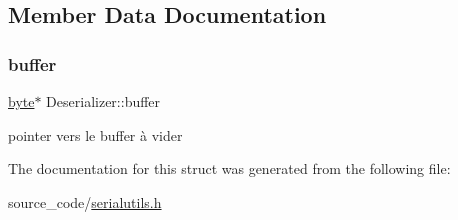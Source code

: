 \subsection{Member Data Documentation}
\mbox{\label{struct_deserializer_a37f4bae0d8a61c6c556ba3e90a10f0c4}} 
\subsubsection{\texorpdfstring{buffer}{buffer}}
{\footnotesize\ttfamily \hyperlink{serialutils_8h_a0c8186d9b9b7880309c27230bbb5e69d}{byte}$\ast$ Deserializer\+::buffer}

pointer vers le buffer à vider 

The documentation for this struct was generated from the following file\+:\begin{DoxyCompactItemize}
\item 
source\+\_\+code/\hyperlink{serialutils_8h}{serialutils.\+h}\end{DoxyCompactItemize}
